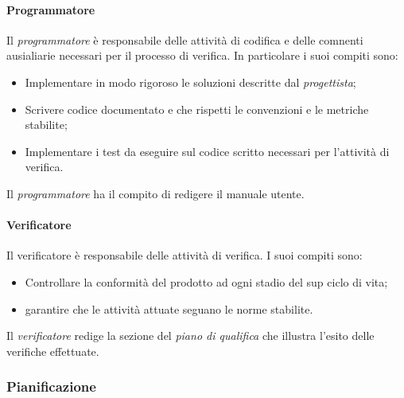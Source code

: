 		\paragraph{Programmatore}
		Il \textit{programmatore} è responsabile delle attività di codifica e delle comnenti ausialiarie necessari per il processo di verifica.
		In particolare i suoi compiti sono:
		\begin{itemize}
			\item Implementare in modo rigoroso le soluzioni descritte dal \textit{progettista};
			\item Scrivere codice documentato e che rispetti le convenzioni e le metriche stabilite;
			\item Implementare i test da eseguire sul codice scritto necessari per l'attività di verifica.
		\end{itemize}
		Il \textit{programmatore}  ha il compito di redigere il manuale utente. 
		\paragraph{Verificatore}
		Il verificatore è responsabile delle attività di verifica.
		I suoi compiti sono:
		\begin{itemize}
			\item Controllare la conformità del prodotto ad ogni stadio del sup ciclo di vita;
			\item garantire che le attività attuate seguano le norme stabilite.
		\end{itemize}
		Il \textit{verificatore} redige la sezione del \textit{piano di qualifica} che illustra l'esito delle verifiche effettuate.


\subsubsection{Pianificazione}
